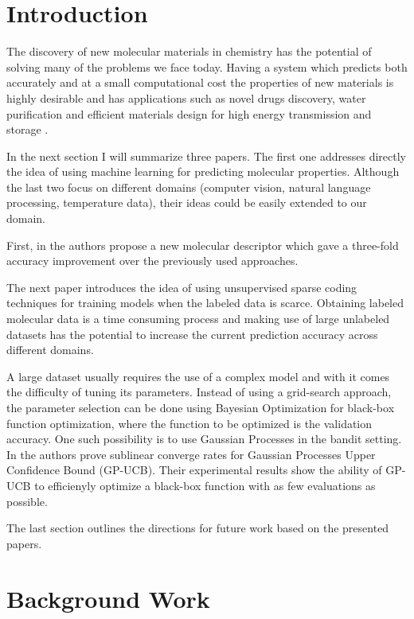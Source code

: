 \documentclass[10pt,journal,a4paper]{IEEEtran}
\begin{document}
\IEEEpeerreviewmaketitle


\section{Introduction}

The discovery of new molecular materials in chemistry has the potential of solving many of the problems we face today.
Having a system which predicts both accurately and at a small computational cost the properties of new materials is highly desirable and has applications such as novel drugs discovery, water purification and efficient materials design for high energy transmission and storage \cite{cleanenergy}. 
 
In the next section I will summarize three papers. The first one\cite{montavon2012learning} addresses directly the idea of using machine learning for predicting molecular properties. Although the last two focus on different domains (computer vision, natural language processing, temperature data), their ideas could be easily extended to our domain.

First, in \cite{montavon2012learning}
the authors propose a new molecular descriptor which gave a three-fold accuracy improvement over the previously used approaches. 

The next paper \cite{selftaughtl} introduces the idea of using unsupervised sparse coding techniques for training models when the labeled data is scarce. Obtaining labeled molecular data is a time consuming process and making use of large unlabeled datasets has the potential to increase the current prediction accuracy across different domains. 

A large dataset usually requires the use of a complex model and with it comes the difficulty of tuning its parameters. Instead of using a grid-search approach, the parameter selection can be done using Bayesian Optimization for black-box function optimization, where the function to be optimized is the validation accuracy. One such possibility is to use Gaussian Processes in the bandit setting. In \cite{srinivas12information} the authors prove sublinear converge rates for Gaussian Processes Upper Confidence Bound (GP-UCB). Their experimental results show the ability of GP-UCB to efficienyly optimize a black-box function with as few evaluations as possible.

The last section outlines the directions for future work based on the presented papers.

\section{Background Work}
\end{document}
